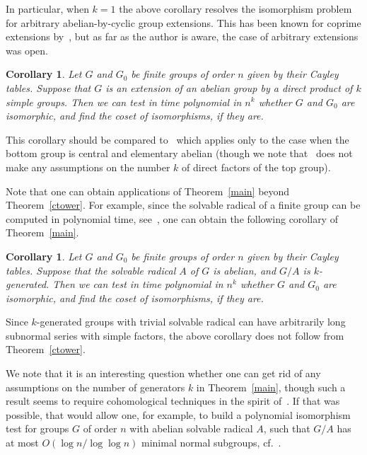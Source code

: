\documentclass{article}
\newtheorem{corollary}[theorem]{Corollary}
\begin{document}
In particular, when \( k = 1 \) the above corollary resolves the isomorphism problem for arbitrary abelian-by-cyclic group extensions.
This has been known for coprime extensions by~\cite{legall}, but as far as the author is aware, the case of arbitrary extensions was open.

\begin{corollary}
	Let \( G \) and \( G_0 \) be finite groups of order \( n \) given by their Cayley tables.
	Suppose that \( G \) is an extension of an abelian group by a direct product of \( k \) simple groups.
	Then we can test in time polynomial in \( n^k \) whether \( G \) and \( G_0 \) are isomorphic, and find the coset of isomorphisms, if they are.
\end{corollary}

This corollary should be compared to~\cite[Theorem~7.1]{grochow} which applies only to the case when the bottom group is central and elementary abelian
(though we note that~\cite[Theorem~7.1]{grochow} does not make any assumptions on the number \( k \) of direct factors of the top group).

Note that one can obtain applications of Theorem~\ref{main} beyond Theorem~\ref{ctower}. For example, since the solvable radical of a finite group
can be computed in polynomial time, see~\cite[Section~6.3.1]{seress}, one can obtain the following corollary of Theorem~\ref{main}.

\begin{corollary}
	Let \( G \) and \( G_0 \) be finite groups of order \( n \) given by their Cayley tables.
	Suppose that the solvable radical \( A \) of \( G \) is abelian, and \( G/A \) is \( k \)-generated.
	Then we can test in time polynomial in \( n^k \) whether \( G \) and \( G_0 \) are isomorphic, and find the coset of isomorphisms, if they are.
\end{corollary}

Since \( k \)-generated groups with trivial solvable radical can have arbitrarily long subnormal series with simple factors, the above corollary does not follow
from Theorem~\ref{ctower}.

We note that it is an interesting question whether one can get rid of any assumptions on the number of generators \( k \) in Theorem~\ref{main},
though such a result seems to require cohomological techniques in the spirit of~\cite{grochow}.
If that was possible, that would allow one, for example, to build a polynomial isomorphism test for groups \( G \) of order \( n \) with abelian solvable radical \( A \),
such that \( G/A \) has at most \( O(\log n / \log \log n) \) minimal normal subgroups, cf.~\cite[Corollary~6.13]{grochow}.
\end{document}
